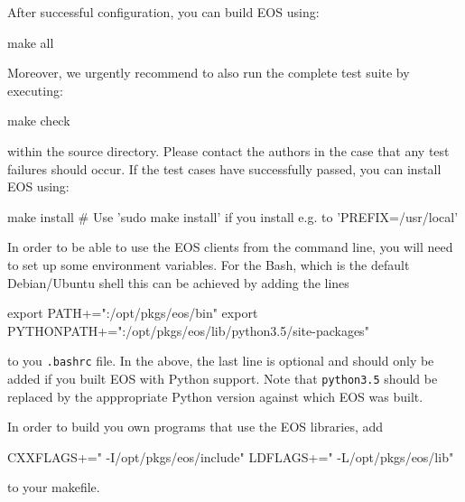 After successful configuration, you can build EOS using:
%
\begin{commandline}
make all
\end{commandline}
%
Moreover, we urgently recommend to also run the complete test suite by executing:
%
\begin{commandline}
make check
\end{commandline}
%
within the source directory. Please contact the authors in the case that any
test failures should occur. If the test cases have successfully passed, you can install EOS using:
\begin{commandline}
make install # Use 'sudo make install' if you install e.g. to 'PREFIX=/usr/local'
\end{commandline}


In order to be able to use the EOS clients from the command line, you will need to
set up some environment variables. For the Bash, which is the default Debian/Ubuntu
shell this can be achieved by adding the lines
\begin{commandline}
export PATH+=":/opt/pkgs/eos/bin"
export PYTHONPATH+=":/opt/pkgs/eos/lib/python3.5/site-packages"
\end{commandline}
to you \texttt{.bashrc} file. In the above, the last line is optional and should only be
added if you built EOS with Python support. Note that \texttt{python3.5} should be
replaced by the apppropriate Python version against which EOS was built.


In order to build you own programs that use the EOS libraries,
add
\begin{commandline}
CXXFLAGS+=" -I/opt/pkgs/eos/include"
LDFLAGS+=" -L/opt/pkgs/eos/lib"
\end{commandline}
to your makefile.
